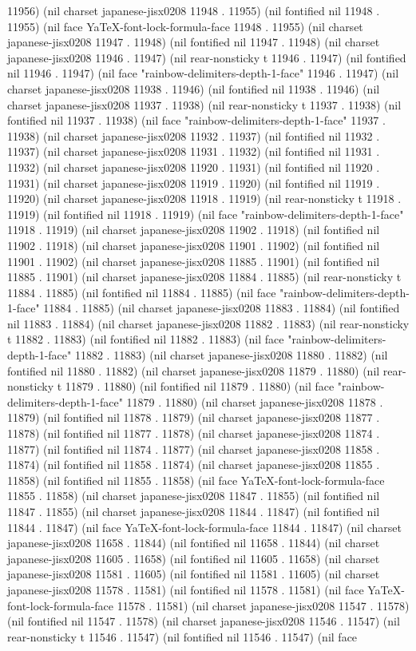 11956) (nil charset japanese-jisx0208 11948 . 11955) (nil fontified nil 11948 . 11955) (nil face YaTeX-font-lock-formula-face 11948 . 11955) (nil charset japanese-jisx0208 11947 . 11948) (nil fontified nil 11947 . 11948) (nil charset japanese-jisx0208 11946 . 11947) (nil rear-nonsticky t 11946 . 11947) (nil fontified nil 11946 . 11947) (nil face "rainbow-delimiters-depth-1-face" 11946 . 11947) (nil charset japanese-jisx0208 11938 . 11946) (nil fontified nil 11938 . 11946) (nil charset japanese-jisx0208 11937 . 11938) (nil rear-nonsticky t 11937 . 11938) (nil fontified nil 11937 . 11938) (nil face "rainbow-delimiters-depth-1-face" 11937 . 11938) (nil charset japanese-jisx0208 11932 . 11937) (nil fontified nil 11932 . 11937) (nil charset japanese-jisx0208 11931 . 11932) (nil fontified nil 11931 . 11932) (nil charset japanese-jisx0208 11920 . 11931) (nil fontified nil 11920 . 11931) (nil charset japanese-jisx0208 11919 . 11920) (nil fontified nil 11919 . 11920) (nil charset japanese-jisx0208 11918 . 11919) (nil rear-nonsticky t 11918 . 11919) (nil fontified nil 11918 . 11919) (nil face "rainbow-delimiters-depth-1-face" 11918 . 11919) (nil charset japanese-jisx0208 11902 . 11918) (nil fontified nil 11902 . 11918) (nil charset japanese-jisx0208 11901 . 11902) (nil fontified nil 11901 . 11902) (nil charset japanese-jisx0208 11885 . 11901) (nil fontified nil 11885 . 11901) (nil charset japanese-jisx0208 11884 . 11885) (nil rear-nonsticky t 11884 . 11885) (nil fontified nil 11884 . 11885) (nil face "rainbow-delimiters-depth-1-face" 11884 . 11885) (nil charset japanese-jisx0208 11883 . 11884) (nil fontified nil 11883 . 11884) (nil charset japanese-jisx0208 11882 . 11883) (nil rear-nonsticky t 11882 . 11883) (nil fontified nil 11882 . 11883) (nil face "rainbow-delimiters-depth-1-face" 11882 . 11883) (nil charset japanese-jisx0208 11880 . 11882) (nil fontified nil 11880 . 11882) (nil charset japanese-jisx0208 11879 . 11880) (nil rear-nonsticky t 11879 . 11880) (nil fontified nil 11879 . 11880) (nil face "rainbow-delimiters-depth-1-face" 11879 . 11880) (nil charset japanese-jisx0208 11878 . 11879) (nil fontified nil 11878 . 11879) (nil charset japanese-jisx0208 11877 . 11878) (nil fontified nil 11877 . 11878) (nil charset japanese-jisx0208 11874 . 11877) (nil fontified nil 11874 . 11877) (nil charset japanese-jisx0208 11858 . 11874) (nil fontified nil 11858 . 11874) (nil charset japanese-jisx0208 11855 . 11858) (nil fontified nil 11855 . 11858) (nil face YaTeX-font-lock-formula-face 11855 . 11858) (nil charset japanese-jisx0208 11847 . 11855) (nil fontified nil 11847 . 11855) (nil charset japanese-jisx0208 11844 . 11847) (nil fontified nil 11844 . 11847) (nil face YaTeX-font-lock-formula-face 11844 . 11847) (nil charset japanese-jisx0208 11658 . 11844) (nil fontified nil 11658 . 11844) (nil charset japanese-jisx0208 11605 . 11658) (nil fontified nil 11605 . 11658) (nil charset japanese-jisx0208 11581 . 11605) (nil fontified nil 11581 . 11605) (nil charset japanese-jisx0208 11578 . 11581) (nil fontified nil 11578 . 11581) (nil face YaTeX-font-lock-formula-face 11578 . 11581) (nil charset japanese-jisx0208 11547 . 11578) (nil fontified nil 11547 . 11578) (nil charset japanese-jisx0208 11546 . 11547) (nil rear-nonsticky t 11546 . 11547) (nil fontified nil 11546 . 11547) (nil face 
